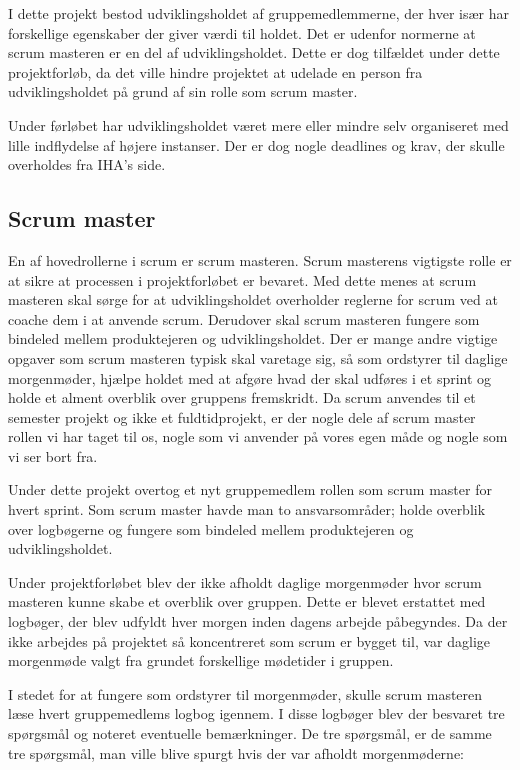 	I dette projekt bestod udviklingsholdet af gruppemedlemmerne, der hver især har forskellige egenskaber der giver værdi til holdet. Det er udenfor normerne at scrum masteren er en del af udviklingsholdet. Dette er dog tilfældet under dette projektforløb, da det ville hindre projektet at udelade en person fra udviklingsholdet på grund af sin rolle som scrum master. \par
	Under førløbet har udviklingsholdet været mere eller mindre selv organiseret med lille indflydelse af højere instanser. Der er dog nogle deadlines og krav, der skulle overholdes fra IHA's side.
	
	
	\subsection{Scrum master}
	En af hovedrollerne i scrum er scrum masteren. Scrum masterens vigtigste rolle er at sikre at processen i projektforløbet er bevaret. Med dette menes at scrum masteren skal sørge for at udviklingsholdet overholder reglerne for scrum ved at coache dem i at anvende scrum. Derudover skal scrum masteren fungere som bindeled mellem produktejeren og udviklingsholdet. Der er mange andre vigtige opgaver som scrum masteren typisk skal varetage sig, så som ordstyrer til daglige morgenmøder, hjælpe holdet med at afgøre hvad der skal udføres i et sprint og holde et alment overblik over gruppens fremskridt. Da scrum anvendes til et semester projekt og ikke et fuldtidprojekt, er der nogle dele af scrum master rollen vi har taget til os, nogle som vi anvender på vores egen måde og nogle som vi ser bort fra. \newline
	
	Under dette projekt overtog et nyt gruppemedlem rollen som scrum master for hvert sprint. Som scrum master havde man to ansvarsområder; holde overblik over logbøgerne og fungere som bindeled mellem produktejeren og udviklingsholdet. \newline
	
	Under projektforløbet blev der ikke afholdt daglige morgenmøder hvor scrum masteren kunne skabe et overblik over gruppen. Dette er blevet erstattet med logbøger, der blev udfyldt hver morgen inden dagens arbejde påbegyndes. Da der ikke arbejdes på projektet så koncentreret som scrum er bygget til, var daglige morgenmøde valgt fra grundet forskellige mødetider i gruppen. \par
	I stedet for at fungere som ordstyrer til morgenmøder, skulle scrum masteren læse hvert gruppemedlems logbog igennem. I disse logbøger blev der besvaret tre spørgsmål og noteret eventuelle bemærkninger. De tre spørgsmål, er de samme tre spørgsmål, man ville blive spurgt hvis der var afholdt morgenmøderne:
	
